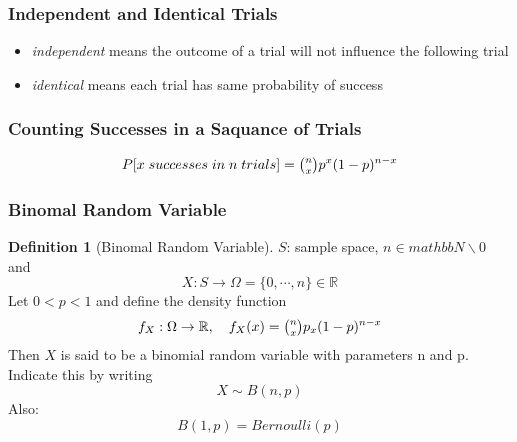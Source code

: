 \documentclass{article}
\theoremstyle{definition}
\newtheorem{definition}{Definition}[subsection]
\begin{document}
\subsubsection{Independent and Identical Trials}
\begin{itemize}
    \item \emph{independent} means the outcome of a trial will not influence the following trial
    \item \emph{identical} means each trial has same probability of success
\end{itemize}
\subsubsection{Counting Successes in a Saquance of Trials}
\begin{equation}
    P[x\;successes\;in\;n\;trials] = \tbinom{n}{x}p^x(1-p)^{n-x}
\end{equation}
\subsubsection{Binomal Random Variable}
\begin{definition}[Binomal Random Variable]
    $S$: sample space, $n \in mathbb{N} \backslash {0} $ and
    \begin{equation}
        X:S\rightarrow \Omega=\{ 0,\dotsm,n \}\in \mathbb{R}
    \end{equation}
    Let $ 0<p<1 $ and define the density function
    \begin{equation}
        f_X:\Omega \rightarrow \mathbb{R},\quad f_X(x)=\tbinom{n}{x}p_x(1-p)^{n-x}
    \end{equation}
    Then $ X $ is said to be a binomial random variable with parameters n and p. Indicate this by writing
    \begin{equation}
        X \sim B(n,p)
    \end{equation}
    Also:
    \begin{equation}
        B(1,p) = Bernoulli(p)
    \end{equation}
\end{definition}
\end{document}
